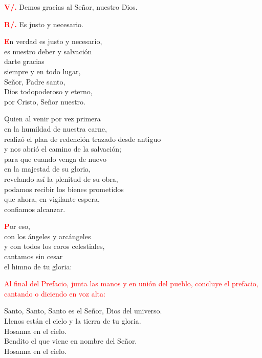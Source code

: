 \documentclass[12pt, letterpaper]{report}
\begin{document}
\noindent
\Large {\bfseries \textcolor{red}{V/.}} \hspace{0.5cm} Demos gracias al Se\~nor, nuestro Dios.

\noindent
\Large {\bfseries \textcolor{red}{R/.}} \hspace{0.5cm} Es justo y necesario.

\lettrine[lines=1]{\bfseries \textcolor{red}{E}}{}\Large n verdad es justo y necesario,\\
    es nuestro deber y salvaci\'on\\
    darte gracias\\
    siempre y en todo lugar,\\
    Se\~nor, Padre santo,\\
    Dios todopoderoso y eterno,\\
    por Cristo, Se\~nor nuestro.

\noindent
\Large Quien al venir por vez primera\\
    en la humildad de nuestra carne,\\
    realiz\'o el plan de redenci\'on trazado desde antiguo\\
    y nos abri\'o el camino de la salvaci\'on;\\
    para que cuando venga de nuevo\\
    en la majestad de su gloria,\\
    revelando as\'i la plenitud de su obra,\\
    podamos recibir los bienes prometidos\\
    que ahora, en vigilante espera,\\
    confiamos alcanzar.

\lettrine[lines=1]{\bfseries \textcolor{red}{P}}{}\Large or eso,\\
    con los \'angeles y arc\'angeles\\
    y con todos los coros celestiales,\\
    cantamos sin cesar\\
    el himno de tu gloria:
    
\large{\textcolor{red}{Al final del Prefacio, junta las manos y en uni\'on del pueblo, concluye el prefacio, cantando o diciendo en voz alta:}}

\noindent
\Large {Santo, Santo, Santo es el Se\~nor, Dios del universo.\\
Llenos est\'an el cielo y la tierra de tu gloria.\\
Hosanna en el cielo.\\
Bendito el que viene en nombre del Se\~nor.\\
Hosanna en el cielo.}
\end{document}

